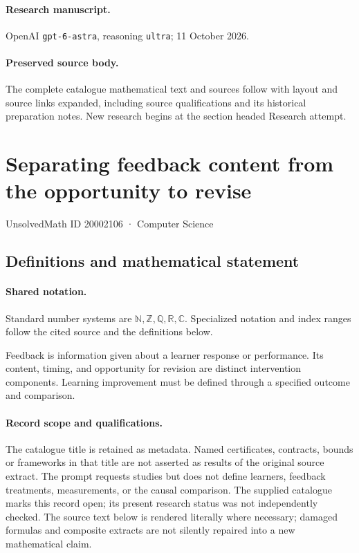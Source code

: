 \documentclass[11pt]{article}
\begin{document}
\paragraph{Research manuscript.} OpenAI \texttt{gpt-6-astra}, reasoning \texttt{ultra}; 11 October 2026.
\paragraph{Preserved source body.} The complete catalogue mathematical text and sources follow with layout and source links expanded, including source qualifications and its historical preparation notes. New research begins at the section headed Research attempt.

\section{Separating feedback content from the opportunity to revise}\label{20002106}
{\small UnsolvedMath ID 20002106 · Computer Science}
\subsection{Definitions and mathematical statement}

\paragraph{Shared notation.}Standard number systems are $\mathbb N,\mathbb Z,\mathbb Q,\mathbb R,\mathbb C$. Specialized notation and index ranges follow the cited source and the definitions below.


Feedback is information given about a learner response or performance. Its content, timing, and opportunity for revision are distinct intervention components. Learning improvement must be defined through a specified outcome and comparison.
\paragraph{Record scope and qualifications.}
The catalogue title is retained as metadata. Named certificates, contracts, bounds or frameworks in that title are not asserted as results of the original source extract.
The prompt requests studies but does not define learners, feedback treatments, measurements, or the causal comparison. The supplied catalogue marks this record open; its present research status was not independently checked.
The source text below is rendered literally where necessary; damaged formulas and composite extracts are not silently repaired into a new mathematical claim.
\end{document}
